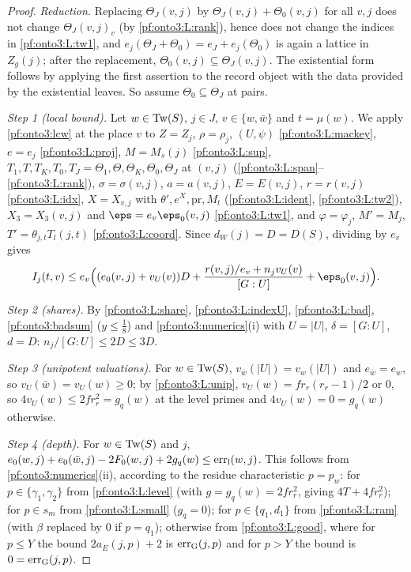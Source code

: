 \begin{proof}
\emph{Reduction.} Replacing $\Theta_J(v,j)$ by $\Theta_J(v,j)+\Theta_0(v,j)$ for all $v,j$ does not change
$\Theta_J(v,j)_v$ (by \ref{pf:onto3:L:rank}), hence does not change the indices in \ref{pf:onto3:L:tw1}, and
$e_j(\Theta_J+\Theta_0)=e_J+e_j(\Theta_0)$ is again a lattice in $Z_g(j)$; after the replacement,
$\Theta_0(v,j)\subseteq\Theta_J(v,j)$. The existential form follows by applying the first assertion to the
record object with the data provided by the existential leaves. So assume $\Theta_0\subseteq\Theta_J$ at pairs.

\emph{Step 1 (local bound).} Let $w\in\mathrm{Tw}(S)$, $j\in J$, $v\in\{w,\bar w\}$ and $t=\mu(w)$. We apply
\cref{pf:onto3:lcw} at the place $v$ to $Z=Z_j$, $\rho=\rho_j$, $(U,\psi)$ \ref{pf:onto3:L:mackey}, $e=e_j$
\ref{pf:onto3:L:proj}, $M=M_s(j)$ \ref{pf:onto3:L:sup}, $T_1,T,T_K,T_0,T_J=\Theta_1,\Theta,\Theta_K,\Theta_0,
\Theta_J$ at $(v,j)$ (\ref{pf:onto3:L:span}--\ref{pf:onto3:L:rank}), $\sigma=\sigma(v,j)$, $a=a(v,j)$,
$E=E(v,j)$, $r=r(v,j)$ \ref{pf:onto3:L:idx}, $X=X_{v,j}$ with $\theta',e^X,\mathrm{pr},M_t$
(\ref{pf:onto3:L:ident}, \ref{pf:onto3:L:tw2}), $X_3=X_3(v,j)$ and $\eps=e_v\eps_0(v,j)$ \ref{pf:onto3:L:tw1}, and
$\varphi=\varphi_j$, $M'=M_j$, $T'=\theta_{j,t}T_l(j,t)$ \ref{pf:onto3:L:coord}. Since $d_W(j)=D=D(S)$, dividing
by $e_v$ gives
\begin{equation}\label{eq:pf:onto3:loc}
I_j(t,v)\le e_v\Bigl((e_0(v,j)+v_U(v))D+\frac{r(v,j)/e_v+n_jv_U(v)}{[G:U]}+\eps_0(v,j)\Bigr).
\end{equation}

\emph{Step 2 (shares).} By \ref{pf:onto3:L:share}, \ref{pf:onto3:L:indexU}, \ref{pf:onto3:L:bad},
\cref{pf:onto3:badsum} ($y\le\frac18$) and \cref{pf:onto3:numerics}(i) with $U=|U|$, $\delta=[G:U]$, $d=D$:
$n_j/[G:U]\le2D\le3D$.

\emph{Step 3 (unipotent valuations).} For $w\in\mathrm{Tw}(S)$, $v_{\bar w}(|U|)=v_w(|U|)$ and $e_{\bar
w}=e_w$, so $v_U(\bar w)=v_U(w)\ge0$; by \ref{pf:onto3:L:unip}, $v_U(w)=fr_r(r_r-1)/2$ or $0$, so $4v_U(w)\le
2fr_r^2=g_q(w)$ at the level primes and $4v_U(w)=0=g_q(w)$ otherwise.

\emph{Step 4 (depth).} For $w\in\mathrm{Tw}(S)$ and $j$,
$e_0(w,j)+e_0(\bar w,j)-2F_0(w,j)+2g_q(w)\le\mathrm{err}_{\mathrm{l}}(w,j)$. This follows from
\cref{pf:onto3:numerics}(ii), according to the residue characteristic $p=p_w$: for $p\in\{\gamma_1,\gamma_2\}$
from \ref{pf:onto3:L:level} (with $g=g_q(w)=2fr_r^2$, giving $4T+4fr_r^2$); for $p\in s_m$ from
\ref{pf:onto3:L:small} ($g_q=0$); for $p\in\{q_1,d_1\}$ from \ref{pf:onto3:L:ram} (with $\beta$ replaced by $0$
if $p=q_1$); otherwise from \ref{pf:onto3:L:good}, where for $p\le Y$ the bound $2a_E(j,p)+2$ is
$\mathrm{err}_{\mathrm{G}}(j,p)$ and for $p>Y$ the bound is $0=\mathrm{err}_{\mathrm{G}}(j,p)$.


\end{proof}
